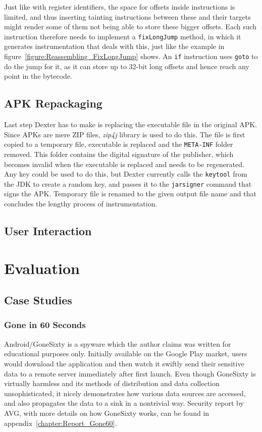 \documentclass[12pt,twoside,notitlepage]{report}
\begin{document}
Just like with register identifiers, the space for offsets inside instructions is limited, and thus inserting tainting instructions between these and their targets might render some of them not being able to store these bigger offsets. Each such instruction therefore needs to implement a \verb$fixLongJump$ method, in which it generates instrumentation that deals with this, just like the example in figure~\ref{figure:Reassembling_FixLongJump} shows. An \verb$if$ instruction uses \verb$goto$ to do the jump for it, as it can store up to 32-bit long offsets and hence reach any point in the bytecode. 

\section{APK Repackaging}

Last step Dexter has to make is replacing the executable file in the original APK. Since APKs are mere ZIP files, \emph{zip4j} library is used to do this. The file is first copied to a temporary file, executable is replaced and the \verb$META-INF$ folder removed. This folder contains the digital signature of the publisher, which becomes invalid when the executable is replaced and needs to be regenerated. Any key could be used to do this, but Dexter currently calls the \verb$keytool$ from the JDK to create a random key, and passes it to the \verb$jarsigner$ command that signs the APK. Temporary file is renamed to the given output file name and that concludes the lengthy process of instrumentation.

\section{User Interaction}

\cleardoublepage
\chapter{Evaluation}

\section{Case Studies}

\subsection{Gone in 60 Seconds}

Android/GoneSixty is a spyware which the author claims was written for educational purposes only. Initially available on the Google Play market, users would download the application and then watch it swiftly send their sensitive data to a remote server immediately after first launch. Even though GoneSixty is virtually harmless and its methods of distribution and data collection unsophisticated, it nicely demonstrates how various data sources are accessed, and also propagates the data to a sink in a nontrivial way. Security report by AVG, with more details on how GoneSixty works, can be found in appendix~\ref{chapter:Report_Gone60}.
\end{document}
